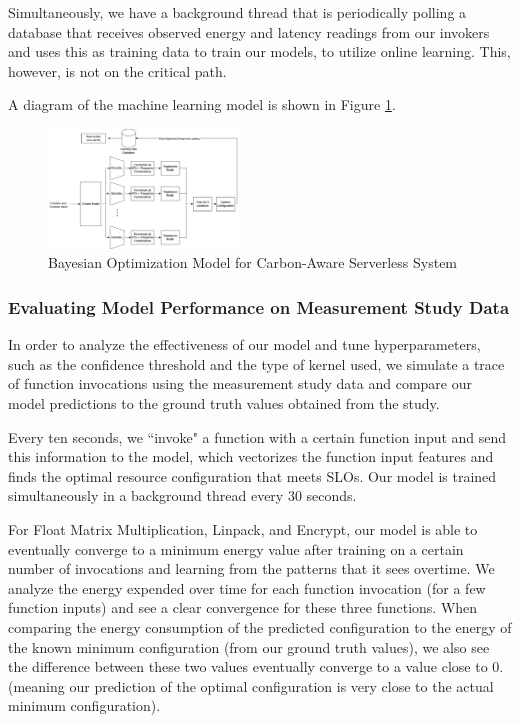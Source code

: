 \documentclass[times, 10pt,twocolumn]{article}
\begin{document}
Simultaneously, we have a background thread that is periodically polling a database that receives observed energy and latency readings from our invokers and uses this as training data to train our models, to utilize online learning. This, however, is not on the critical path.

A diagram of the machine learning model is shown in Figure \ref{fig:ml_model}.

\begin{figure}[ht]
   \centering
   \includegraphics[width=0.45\textwidth]{imgs/ml_model.png}
   \caption{Bayesian Optimization Model for Carbon-Aware Serverless System}
   \label{fig:ml_model}
 \end{figure}

 \subsubsection{Evaluating Model Performance on Measurement Study Data}
In order to analyze the effectiveness of our model and tune hyperparameters, such as the confidence threshold and the type of kernel used, we simulate a trace of function invocations using the measurement study data and compare our model predictions to the ground truth values obtained from the study.

Every ten seconds, we ``invoke" a function with a certain function input and send this information to the model, which vectorizes the function input features and finds the optimal resource configuration that meets SLOs. Our model is trained simultaneously in a background thread every 30 seconds. 
 
For Float Matrix Multiplication, Linpack, and Encrypt, our model is able to eventually converge to a minimum energy value after training on a certain number of invocations and learning from the patterns that it sees overtime. We analyze the energy expended over time for each function invocation (for a few function inputs) and see a clear convergence for these three functions. When comparing the energy consumption of the predicted configuration to the energy of the known minimum configuration (from our ground truth values), we also see the difference between these two values eventually converge to a value close to 0. (meaning our prediction of the optimal configuration is very close to the actual minimum configuration).  
\end{document}
